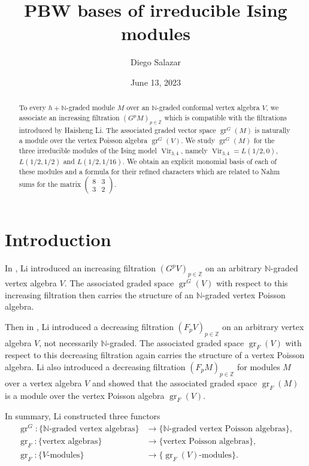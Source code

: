 \documentclass[a4paper, 12pt, reqno]{amsart}
\theoremstyle{remark}
\DeclareMathOperator{\Vir}{Vir}
\DeclareMathOperator{\gr}{gr}
\begin{document}
\begin{abstract}
  To every $h + \mathbb{N}$-graded module $M$ over an $\mathbb{N}$-graded conformal vertex algebra $V$, we associate an increasing filtration $(G^pM)_{p \in \mathbb{Z}}$ which is compatible with the filtrations introduced by Haisheng Li.
  The associated graded vector space $\gr^G(M)$ is naturally a module over the vertex Poisson algebra $\gr^G(V)$.
  We study $\gr^G(M)$ for the three irreducible modules of the Ising model $\Vir_{3, 4}$, namely $\Vir_{3,4} = L(1/2, 0)$, $L(1/2, 1/2)$ and $L(1/2, 1/16)$.
  We obtain an explicit monomial basis of each of these modules and a formula for their refined characters which are related to Nahm sums for the matrix $\left(\begin{smallmatrix} 8 & 3 \\ 3 & 2 \end{smallmatrix}\right)$.
\end{abstract}

\title{PBW bases of irreducible Ising modules}
\author{Diego Salazar}
\address{Instituto de Matemática Pura e Aplicada, Rio de Janeiro, RJ, Brazil}
\date{June 13, 2023}
\maketitle

\section{Introduction}
\label{sec:introduction}

In \cite{li_vertex_2004}, Li introduced an increasing filtration $(G^pV)_{p \in \mathbb{Z}}$ on an arbitrary $\mathbb{N}$-graded vertex algebra $V$.
The associated graded space $\gr^G(V)$ with respect to this increasing filtration then carries the structure of an $\mathbb{N}$-graded vertex Poisson algebra.

Then in \cite{li_abelianizing_2005}, Li introduced a decreasing filtration $(F_pV)_{p \in \mathbb{Z}}$ on an arbitrary vertex algebra $V$, not necessarily $\mathbb{N}$-graded.
The associated graded space $\gr_F(V)$ with respect to this decreasing filtration again carries the structure of a vertex Poisson algebra.
Li also introduced a decreasing filtration $(F_pM)_{p \in \mathbb{Z}}$ for modules $M$ over a vertex algebra $V$ and showed that the associated graded space $\gr_F(M)$ is a module over the vertex Poisson algebra $\gr_F(V)$.

In summary, Li constructed three functors
\begin{align*}
  \gr^G: \{\text{$\mathbb{N}$-graded vertex algebras}\} &\to \{\text{$\mathbb{N}$-graded vertex Poisson algebras}\}, \\
  \gr_F: \{\text{vertex algebras}\} &\to \{\text{vertex Poisson algebras}\}, \\
  \gr_F: \{\text{$V$-modules}\} &\to \{\text{$\gr_F(V)$-modules}\}.
\end{align*}
\end{document}
